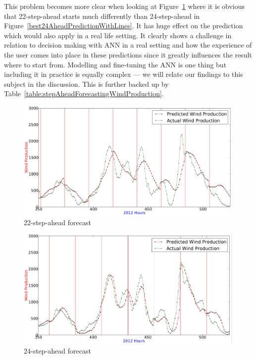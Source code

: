 This problem becomes more clear when looking at Figure~\ref{fig:best22vsbest24Ahead} where it is obvious that 22-step-ahead starts much differently than 24-step-ahead in Figure~\ref{best24AheadPredictionWithLines}. It has huge effect on the prediction which would also apply in a real life setting. It clearly shows a challenge in relation to decision making with ANN in a real setting and how the experience of the user comes into place in these predictions since it greatly influences the result where to start from. Modelling and fine-tuning the ANN is one thing but including it in practice is equally complex --- we will relate our findings to this subject in the discussion. This is further backed up by Table~\ref{table:stepAheadForecastingWindProduction}.

\begin{figure}[H]
\centering
\includegraphics[width=0.99\textwidth]{billeder/best22vsbest24Ahead.png}
\caption{22-step-ahead forecast}
\label{fig:best22vsbest24Ahead}
\end{figure}

\begin{figure}[H]
\centering
\includegraphics[width=0.99\textwidth]{billeder/best24AheadPredictionWithLines.png}
\caption{24-step-ahead forecast}
\label{fig:best24AheadPredictionWithLines}
\end{figure} 

